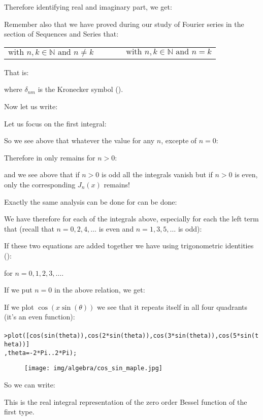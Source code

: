 	Therefore identifying real and imaginary part, we get:
	
	Remember also that we have proved during our study of Fourier series in the section of Sequences and Series that:
	
	\begin{center}
	\begin{tabular}{ccc}
	$\text{with }n,k\in \mathbb{N}\text{ and }n\ne k$
	&$\qquad$&
	$\text{with }n,k\in \mathbb{N}\text{ and }n = k$
	\end{tabular}
	\end{center}
	That is:
	
	where $\delta_{nm}$ is the Kronecker symbol ().
	
	Now let us write:
	
	Let us focus on the first integral:
	
	So we see above that whatever the value for any $n$, excepte of $n=0$:
	
	Therefore in only remains for $n>0$:
	
	and we see above that if $n>0$ is odd all the integrals vanish but if $n>0$ is even, only the corresponding $J_n(x)$ remains!
	
	Exactly the same analysis can be done for can be done:
	
	We have therefore for each of the integrals above, especially for each the left term that (recall that $n=0,2,4,\ldots$ is even and $n=1,3,5,\ldots$ is odd):
	
	If these two equations are added together we have using trigonometric identities ():
	
	for $n=0,1,2,3,\ldots$.
	
	If we put $n=0$ in the above relation, we get:
	
	If we plot $\cos(x\sin(\theta))$ we see that it repeats itself in all four quadrants (it's an even function):\\\\
	\texttt{>plot([cos(sin(theta)),cos(2*sin(theta)),cos(3*sin(theta)),cos(5*sin(theta))]\\
	,theta=-2*Pi..2*Pi);}
	\begin{figure}[H]
		\centering
		\texttt{[image: img/algebra/cos\_sin\_maple.jpg]}
	\end{figure}
	So we can write:
	
	This is the real integral representation of the zero order Bessel function of the first type.
	
